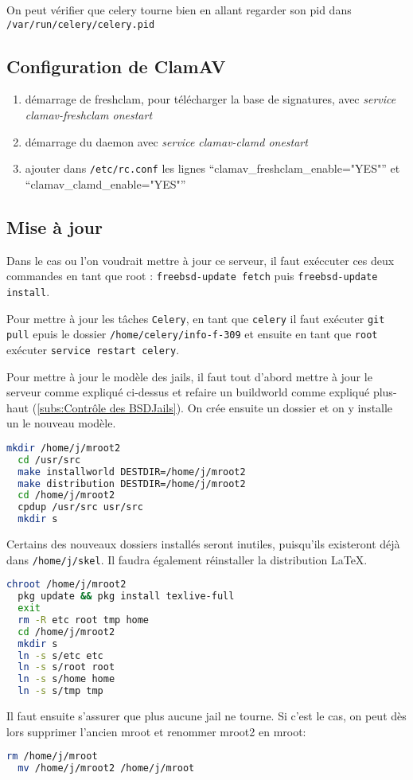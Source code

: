 \documentclass[10pt,a4paper]{article}
\begin{document}
On peut vérifier que celery tourne bien en allant regarder son pid dans \texttt{/var/run/celery/celery.pid}

\subsection{Configuration de ClamAV}
\begin{enumerate}
  \item démarrage de freshclam, pour télécharger la base de signatures, avec \emph{service clamav-freshclam onestart}
  \item démarrage du daemon avec \emph{service clamav-clamd onestart}
  \item ajouter dans \texttt{/etc/rc.conf} les lignes ``clamav\_freshclam\_enable="YES"'' et ``clamav\_clamd\_enable="YES"''
\end{enumerate}

\subsection{Mise à jour}

Dans le cas ou l'on voudrait mettre à jour ce serveur,
il faut exéccuter ces deux commandes en tant que root :
\texttt{freebsd-update fetch} puis \texttt{freebsd-update install}.

Pour mettre à jour les tâches \texttt{Celery},
en tant que \texttt{celery} il faut exécuter \texttt{git pull}
epuis le dossier \texttt{/home/celery/info-f-309}
et ensuite en tant que \texttt{root} exécuter \texttt{service restart celery}.

Pour mettre à jour le modèle des jails, il faut tout d'abord mettre à jour le serveur comme expliqué ci-dessus et refaire un buildworld comme expliqué plus-haut (\ref{subs:Contrôle des BSDJails}). On crée ensuite un dossier et on y installe un le nouveau modèle.
\begin{lstlisting}[language=bash]
  mkdir /home/j/mroot2
  cd /usr/src
  make installworld DESTDIR=/home/j/mroot2
  make distribution DESTDIR=/home/j/mroot2
  cd /home/j/mroot2
  cpdup /usr/src usr/src
  mkdir s
\end{lstlisting}
Certains des nouveaux dossiers installés seront inutiles, puisqu'ils existeront déjà dans \texttt{/home/j/skel}. Il faudra également réinstaller la distribution \LaTeX.
\begin{lstlisting}[language=bash]
  chroot /home/j/mroot2
  pkg update && pkg install texlive-full
  exit
  rm -R etc root tmp home
  cd /home/j/mroot2
  mkdir s
  ln -s s/etc etc
  ln -s s/root root
  ln -s s/home home
  ln -s s/tmp tmp
\end{lstlisting}
Il faut ensuite s'assurer que plus aucune jail ne tourne. Si c'est le cas, on peut dès lors supprimer l'ancien mroot et renommer mroot2 en mroot:
\begin{lstlisting}[language=bash]
  rm /home/j/mroot
  mv /home/j/mroot2 /home/j/mroot
\end{lstlisting}
\end{document}
